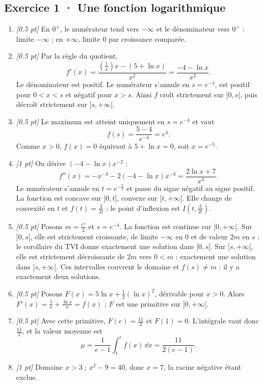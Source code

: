 \subsection*{Exercice 1 · Une fonction logarithmique}\begin{enumerate}

\item \textit{[\num{0,5} pt]} En $0^+$, le numérateur tend vers $-\infty$ et le dénominateur vers $0^+$ : limite $-\infty$ ; en $+\infty$, limite $0$ par croissance comparée.

\item \textit{[\num{0,5} pt]} Par la règle du quotient,
\[f'(x)=\frac{(\frac{1}{x})x-(5+\ln x)}{x^2}=\frac{-4-\ln x}{x^2}.\]
Le dénominateur est positif. Le numérateur s'annule en $s=e^{-4}$, est positif pour $0<x<s$ et négatif pour $x>s$. Ainsi $f$ croît strictement sur $]0,s]$, puis décroît strictement sur $[s,+\infty[$.

\item \textit{[\num{0,5} pt]} Le maximum est atteint uniquement en $s=e^{-4}$ et vaut
\[f(s)=\frac{5- 4}{e^{-4}}=e^{4}.\]
Comme $x>0$, $f(x)=0$ équivaut à $5+\ln x=0$, soit $x=e^{-5}$.

\item \textit{[1 pt]} On dérive $(-4-\ln x)x^{-2}$ :
\[f''(x)=-x^{-3}-2(-4-\ln x)x^{-3}=\frac{2\ln x+7}{x^3}.\]
Le numérateur s'annule en $t=e^{-\frac{7}{2}}$ et passe du signe négatif au signe positif. La fonction est concave sur $]0,t]$, convexe sur $[t,+\infty[$. Elle change de convexité en $t$ et $f(t)=\frac{3}{2t}$ : le point d'inflexion est $I(t,\frac{3}{2t})$.

\item \textit{[\num{0,5} pt]} Posons $m=\frac{e^{4}}{2}$ et $s=e^{-4}$. La fonction est continue sur $]0,+\infty[$. Sur $]0,s]$, elle est strictement croissante, de limite $-\infty$ en $0$ et de valeur $2m$ en $s$ : le corollaire du TVI donne exactement une solution dans $]0,s[$. Sur $[s,+\infty[$, elle est strictement décroissante de $2m$ vers $0<m$ : exactement une solution dans $]s,+\infty[$. Ces intervalles couvrent le domaine et $f(s)\ne m$ : il y a exactement deux solutions.

\item \textit{[\num{0,5} pt]} Posons $F(x)=5\ln x+\frac12(\ln x)^2$, dérivable pour $x>0$. Alors $F'(x)=\frac{5}{x}+\frac{\ln x}{x}=f(x)$ ; $F$ est une primitive sur $]0,+\infty[$.

\item \textit{[\num{0,5} pt]} Avec cette primitive, $F(e)=\frac{11}{2}$ et $F(1)=0$. L'intégrale vaut donc $\frac{11}{2}$, et la valeur moyenne est
\[\mu=\frac{1}{e-1}\int_1^e f(x)\,\dd x=\frac{11}{2(e-1)}.\]

\item \textit{[1 pt]} Domaine $x>3$ ; $x^2-9=40$, donc $x=7$, la racine négative étant exclue.

\end{enumerate}

